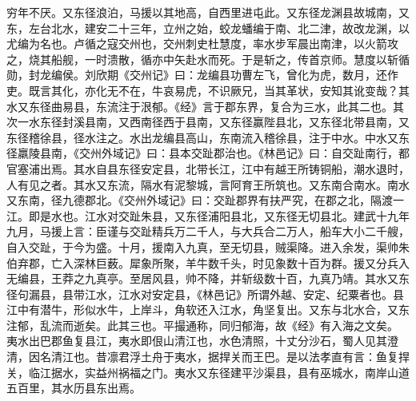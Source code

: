 \documentclass[12pt,UTF8]{ctexbook}
\begin{document}
穷年不厌。又东径浪泊，马援以其地高，自西里进屯此。又东径龙渊县故城南，又东，左台北水，建安二十三年，立州之始，蛟龙蟠编于南、北二津，故改龙渊，以尤编为名也。卢循之寇交州也，交州刺史杜慧度，率水步军晨出南津，以火箭攻之，烧其船舰，一时溃散，循亦中矢赴水而死。于是斩之，传首京师。慧度以斩循勋，封龙编侯。刘欣期《交州记》曰：龙编县功曹左飞，曾化为虎，数月，还作吏。既言其化，亦化无不在，牛哀易虎，不识厥兄，当其革状，安知其讹变哉？其水又东径曲易县，东流注于泿郁。《经》言于郡东界，复合为三水，此其二也。其次一水东径封溪县南，又西南径西于县南，又东径赢陛县北，又东径北带县南，又东径稽徐县，径水注之。水出龙编县高山，东南流入稽徐县，注于中水。中水又东径羸陵县南，《交州外域记》曰：县本交趾郡治也。《林邑记》曰：自交趾南行，都官塞浦出焉。其水自县东径安定县，北带长江，江中有越王所铸铜船，潮水退时，人有见之者。其水又东流，隔水有泥黎城，言阿育王所筑也。又东南合南水。南水又东南，径九德郡北。《交州外域记》曰：交趾郡界有扶严究，在郡之北，隔渡一江。即是水也。江水对交趾朱县，又东径浦阳县北，又东径无切县北。建武十九年九月，马援上言：臣谨与交趾精兵万二千人，与大兵合二万人，船车大小二千艘，自入交趾，于今为盛。十月，援南入九真，至无切县，贼渠降。进入余发，渠帅朱伯弃郡，亡入深林巨薮。犀象所聚，羊牛数千头，时见象数十百为群。援又分兵入无编县，王莽之九真亭。至居风县，帅不降，并斩级数十百，九真乃靖。其水又东径句漏县，县带江水，江水对安定县，《林邑记》所谓外越、安定、纪粟者也。县江中有潜牛，形似水牛，上岸斗，角软还入江水，角坚复出。又东与北水合，又东注郁，乱流而逝矣。此其三也。平撮通称，同归郁海，故《经》有入海之文矣。
夷水出巴郡鱼复县江，夷水即佷山清江也，水色清照，十丈分沙石，蜀人见其澄清，因名清江也。昔凛君浮土舟于夷水，据捍关而王巴。是以法孝直有言：鱼复捍关，临江据水，实益州祸福之门。夷水又东径建平沙渠县，县有巫城水，南岸山道五百里，其水历县东出焉。
\end{document}
